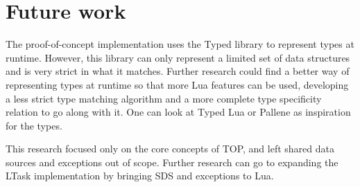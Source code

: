 \section{Future work}
The proof-of-concept implementation uses the Typed library to represent types at runtime. However, this library can only represent a limited set of data structures and is very strict in what it matches. Further research could find a better way of representing types at runtime so that more Lua features can be used, developing a less strict type matching algorithm and a more complete type specificity relation to go along with it. One can look at Typed Lua \cite{maidl2014typed} or Pallene \cite{gualandi2020pallene} as inspiration for the types.

This research focused only on the core concepts of TOP, and left shared data sources and exceptions out of scope. Further research can go to expanding the LTask implementation by bringing SDS and exceptions to Lua.

